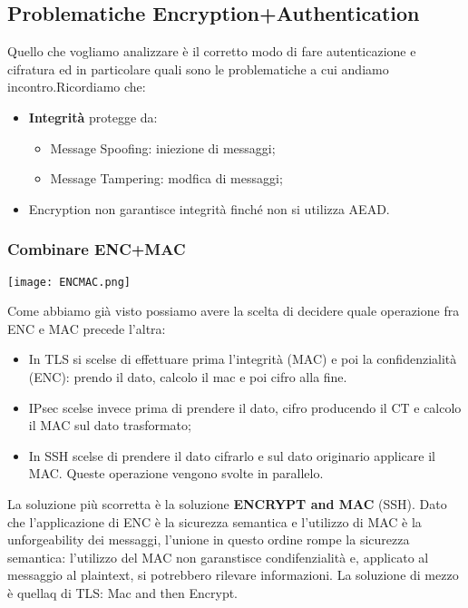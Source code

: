 \documentclass{article}
\theoremstyle{remark}
\begin{document}
\subsection{Problematiche Encryption+Authentication}
Quello che vogliamo analizzare è il corretto modo di fare autenticazione e cifratura ed in particolare quali sono le problematiche a cui andiamo incontro.Ricordiamo che:\begin{itemize}
    \item \textbf{Integrità} protegge da:
    \begin{itemize}
        \item Message Spoofing: iniezione di messaggi;
        \item Message Tampering: modfica di messaggi;
    \end{itemize}
    \item Encryption non garantisce integrità finché non si utilizza AEAD.
\end{itemize}
\subsubsection{Combinare ENC+MAC}
\begin{center}
    \texttt{[image: ENCMAC.png]}
\end{center}
Come abbiamo già visto possiamo avere la scelta di decidere quale operazione fra ENC e MAC precede l'altra:\begin{itemize}
    \item In TLS si scelse di effettuare prima l'integrità (MAC) e poi la confidenzialità (ENC): prendo il dato, calcolo il mac e poi cifro alla fine.
    \item IPsec scelse invece prima di prendere il dato, cifro producendo il CT e calcolo il MAC sul dato trasformato;
    \item In SSH scelse di prendere il dato cifrarlo e sul dato originario applicare il MAC. Queste operazione vengono svolte in parallelo.
\end{itemize} 
La soluzione più scorretta è la soluzione \textbf{ENCRYPT and MAC} (SSH). Dato che l'applicazione di ENC è la sicurezza semantica e l'utilizzo di MAC è la unforgeability dei messaggi, l'unione in questo ordine rompe la sicurezza semantica: l'utilizzo del MAC non garanstisce condifenzialità e, applicato al messaggio al plaintext, si potrebbero rilevare informazioni.
La soluzione di mezzo è quellaq di TLS: Mac and then Encrypt.
\end{document}
